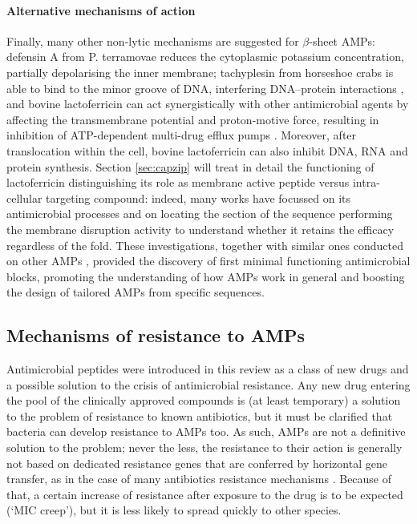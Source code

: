 \paragraph{Alternative mechanisms of action} Finally, many other non-lytic mechanisms are suggested for $\beta$-sheet AMPs: defensin A from P. terramovae reduces the cytoplasmic potassium concentration, partially depolarising the inner membrane; tachyplesin from horseshoe crabs is able to bind to the minor groove of DNA, interfering DNA–protein interactions \cite{Yonezawa1992},
%
and bovine lactoferricin can act synergistically with other antimicrobial agents by affecting the transmembrane potential and proton-motive force, resulting in inhibition of ATP-dependent multi-drug efflux pumps \cite{Gifford2005}.
%
Moreover, after translocation within the cell, bovine lactoferricin can also inhibit DNA, RNA and protein synthesis. Section \ref{sec:capzip} will treat in detail the functioning of lactoferricin distinguishing its role as membrane active peptide versus intra-cellular targeting compound: indeed, many works have focussed on its antimicrobial processes and on locating the section of the sequence performing the membrane disruption activity \cite{Tomita1994,Hwang1998,Schibli1999,Nguyen2005} to understand whether it retains the efficacy regardless of the fold. These investigations, together with similar ones conducted on other AMPs \cite{???}, provided the discovery of first minimal functioning antimicrobial blocks, promoting the understanding of how AMPs work in general and boosting the design of tailored AMPs from specific sequences.


\subsection{Mechanisms of resistance to AMPs}

Antimicrobial peptides were introduced in this review as a class of new drugs and a possible solution to the crisis of antimicrobial resistance. Any new drug entering the pool of the clinically approved compounds is (at least temporary) a solution to the problem of resistance to known antibiotics, but it must be clarified that bacteria can develop resistance to AMPs too.
%
As such, AMPs are not a definitive solution to the problem; never the less, the resistance to their action is generally not based on dedicated resistance genes that are conferred by horizontal gene transfer, as in the case of many antibiotics resistance mechanisms \cite{Peschel2006,Juhas2015}.
Because of that, a certain increase of resistance after exposure to the drug is to be expected (`MIC creep’), %
but it is less likely to spread quickly to other species.

